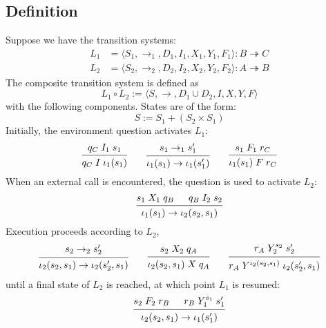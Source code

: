 \documentclass{article}
\begin{document}
\subsection{Definition} %

Suppose we have the transition systems:
\begin{align*}
  L_1 &= \langle S_1, {\rightarrow_1}, D_1, I_1, X_1, Y_1, F_1 \rangle
    : B \twoheadrightarrow C
  \\
  L_2 &= \langle S_2, {\rightarrow_2}, D_2, I_2, X_2, Y_2, F_2 \rangle
    : A \twoheadrightarrow B
\end{align*}
The composite transition system is defined as
\[
  L_1 \circ L_2 :=
  \langle S, {\rightarrow}, D_1 \cup D_2, I, X, Y, F \rangle
\]
with the following components.
States are of the form:
\[
    S := S_1 + (S_2 \times S_1)
\]
Initially, the environment question activates $L_1$:
\[
  \begin{prooftree}
    \hypo{q_C \mathrel{I_1} s_1}
    \infer1{q_C \mathrel{I} \iota_1(s_1)}
  \end{prooftree}
  \qquad
  \begin{prooftree}
    \hypo{s_1 \rightarrow_1 s_1'}
    \infer1{\iota_1(s_1) \rightarrow \iota_1(s_1')}
  \end{prooftree}
  \qquad
  \begin{prooftree}
    \hypo{s_1 \mathrel{F_1} r_C}
    \infer1{\iota_1(s_1) \mathrel{F} r_C}
  \end{prooftree}
\]
When an external call is encountered,
the question is used to activate $L_2$:
\[
  \begin{prooftree}
    \hypo{s_1 \mathrel{X_1} q_B}
    \hypo{q_B \mathrel{I_2} s_2}
    \infer2{\iota_1(s_1) \rightarrow \iota_2(s_2, s_1)}
  \end{prooftree}
\]
Execution proceeds according to $L_2$,
\[
  \begin{prooftree}
    \hypo{s_2 \rightarrow_2 s_2'}
    \infer1{\iota_2(s_2, s_1) \rightarrow \iota_2(s_2', s_1)}
  \end{prooftree}
  \qquad
  \begin{prooftree}
    \hypo{s_2 \mathrel{X_2} q_A}
    \infer1{\iota_2(s_2, s_1) \mathrel{X} q_A}
  \end{prooftree}
  \qquad
  \begin{prooftree}
    \hypo{r_A \mathrel{Y_2^{s_2}} s_2'}
    \infer1{r_A \mathrel{Y^{\iota_2(s_2, s_1)}} \iota_2(s_2', s_1)}
  \end{prooftree}
\]
until a final state of $L_2$ is reached,
at which point $L_1$ is resumed:
\[
  \begin{prooftree}
    \hypo{s_2 \mathrel{F_2} r_B}
    \hypo{r_B \mathrel{Y_1^{s_1}} s_1'}
    \infer2{\iota_2(s_2, s_1) \rightarrow \iota_1(s_1')}
  \end{prooftree}
\]
\end{document}
